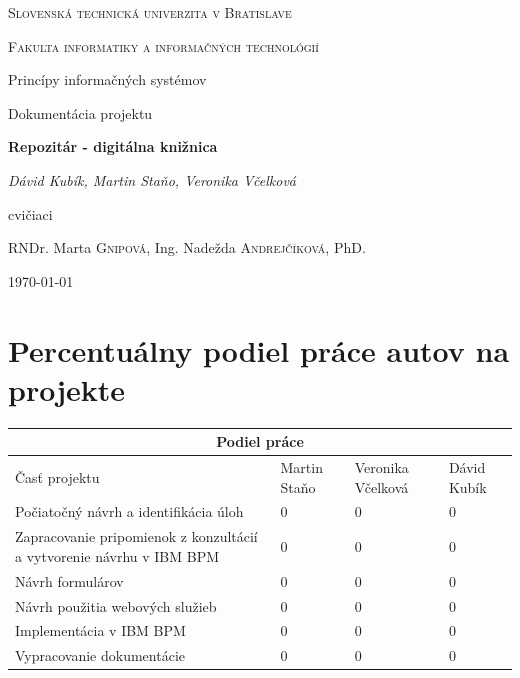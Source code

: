 \documentclass[10pt,oneside,slovak,a4paper]{article}
\begin{document}
\begin{titlepage}
	\centering
	\par\vspace{1cm}
	{\scshape\LARGE Slovenská technická univerzita v Bratislave \par}
	{\scshape\Large Fakulta informatiky a informačných technológií\par}
	\vspace{1.5cm}
	{\large Princípy informačných systémov \par}
	{\large Dokumentácia projektu\par}
	\vspace{5cm}
	{\huge\bfseries Repozitár - digitálna knižnica\par}
	\vspace{0.5cm}
	{\Large\itshape Dávid Kubík, Martin Staňo, Veronika Včelková\par}
	\vfill
	cvičiaci\par
	RNDr. Marta \textsc{Gnipová}, Ing. Nadežda \textsc{Andrejčíková}, PhD.\par
	\vspace{1cm}
	{\large \today\par}
\end{titlepage}

\tableofcontents

\newpage


\section{Percentuálny podiel práce autov na projekte}

\vspace{1cm}

\begin{tabular}{ |p{3cm}||p{2.5cm}|p{3cm}|p{2.5cm}|}
 \hline
 \multicolumn{4}{|c|}{\textbf{Podiel práce}} \\
 \hline
 Časť projektu & Martin Staňo & Veronika Včelková & Dávid Kubík\\
 \hline
 Počiatočný návrh a identifikácia úloh & 0 & 0 &  0\\
 \hline
 Zapracovanie pripomienok z konzultácií a vytvorenie návrhu v IBM BPM & 0 & 0 &  0\\
 \hline
 Návrh formulárov & 0 & 0 &  0\\
 \hline
 Návrh použitia webových služieb & 0 & 0 &  0\\
 \hline
 Implementácia v IBM BPM & 0 & 0 &  0\\
 \hline
 Vypracovanie dokumentácie & 0 & 0 &  0\\
 
 \hline
\end{tabular}
\end{document}
